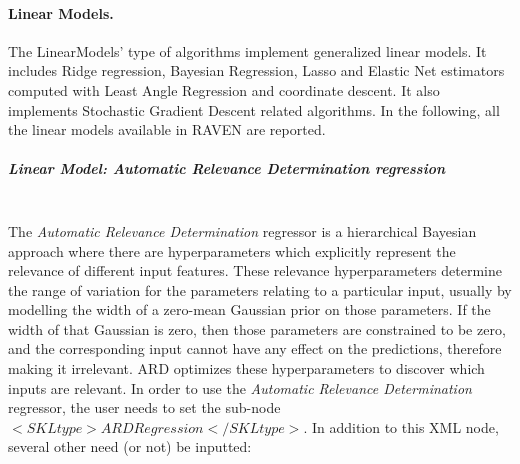 \paragraph{Linear Models.}
\label{LinearModels}
The LinearModels' type of algorithms implement generalized linear models. It includes Ridge regression, Bayesian Regression, Lasso and Elastic Net estimators computed with Least Angle Regression and coordinate descent. It also implements Stochastic Gradient Descent related algorithms.
In the following, all the linear models available in RAVEN are reported.
\subparagraph{Linear Model: Automatic Relevance Determination regression}
\mbox{}
\\The \textit{Automatic Relevance Determination} regressor is a hierarchical Bayesian approach where there are hyperparameters which explicitly represent the relevance of different input features. These relevance hyperparameters determine the range of variation for the parameters relating to a particular input, usually by modelling the width of a zero-mean Gaussian prior on those parameters. If the width of that Gaussian is zero, then those parameters are constrained to be zero, and the corresponding input cannot have any effect on the predictions, therefore making it irrelevant. ARD optimizes these hyperparameters to discover which inputs are relevant.
In order to use the  \textit{Automatic Relevance Determination} regressor, the user needs to set the sub-node $<SKLtype>ARDRegression</SKLtype>$. In addition to this XML node, several other need (or not) be inputted:
